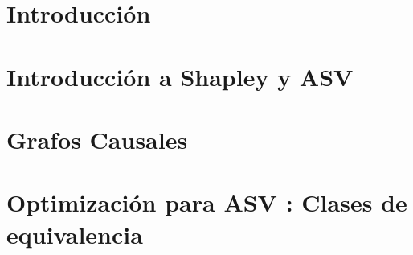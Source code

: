 \documentclass{article}
\begin{document}

\def\autor{Ezequiel Companeetz}
\def\tituloTesis{Optimización de ASV para árboles de decisión}
\def\runtitulo{Optimización de ASV para árboles de decisión}
\def\runtitle{ASV optimization for Decision Trees}
\def\director{Santiago Cifuentes}
\def\codirector{Sergio Abriola}
\def\lugar{Buenos Aires, 2025}


\pagestyle{empty}


\cleardoublepage


\cleardoublepage
\tableofcontents

\pagestyle{headings}


\section{Introducción}



\section{Introducción a Shapley y ASV}\label{Section:ComplejidadShap}



\newpage

\section{Grafos Causales}\label{Section:RedesBayesianas}



\newpage

\section{Optimización para ASV : Clases de equivalencia}\label{Section:HeuristicaASV}


\end{document}
